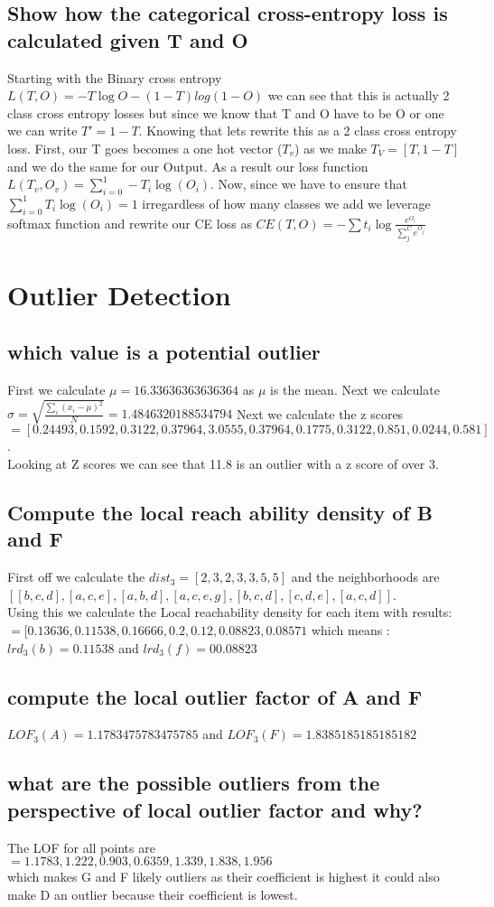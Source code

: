 \documentclass[11pt]{article}
\begin{document}
\subsection{Show how the categorical cross-entropy loss is calculated given T and O}
Starting with the Binary cross entropy $L(T,O) = -T \log O - (1-T) log(1-O)$ we can see that this is actually 2 class cross entropy losses but since we know that T and O have to be O or one we can write $T'=1-T$. Knowing that lets rewrite this as a 2 class cross entropy loss. First, our T goes becomes a one hot vector ($T_v$) as we make $T_V = [T, 1-T]$ and we do the same for our Output. As a result our loss function $L(T_v,O_v) = \sum_{i=0}^1 -T_i \log(O_i)$. Now, since we have to ensure that $\sum_{i=0}^1 T_i \log(O_i) = 1$ irregardless of how many classes we add we leverage softmax function and rewrite our CE loss as $CE(T,O) = - \sum t_i \log \frac{e^{O_i}}{\sum_j^C e^{O_j}}$
\section{Outlier Detection}
\subsection{which value is a potential outlier}
First we calculate $\mu=16.33636363636364$ as $\mu$ is the mean. Next we calculate $\sigma= \sqrt{\frac{\sum_i (x_i-\mu)^2}{N}}= 1.4846320188534794$
Next we calculate the z scores \\$=[ 0.24493,0.1592,0.3122,0.37964,3.0555,0.37964,0.1775, 0.3122,0.851,0.0244,0.581]$. \\ 
Looking at Z scores we can see that 11.8 is an outlier with a z score of over 3.
\subsection{Compute the local reach ability density of B and F}
First off we calculate the $dist_3 = [2,3,2,3,3,5,5]$ and the neighborhoods are \\
$[[b,c,d],[a,c,e],[a,b,d],[a,c,e,g],[b,c,d],[c,d,e],[a,c,d]]$.\\
Using this we calculate the Local reachability density for each item with results:\\
$= [0.13636,0.11538, 0.16666, 0.2, 0.12, 0.08823, 0.08571$ which means : \\
$lrd_3(b)=0.11538$ and  $lrd_3(f)=00.08823$
\subsection{compute the local outlier factor of A and F}
$LOF_3(A) = 1.1783475783475785$ and $LOF_3(F)= 1.8385185185185182$
\subsection{what are the possible outliers from the perspective of local outlier factor and why?}
The LOF for all points are \\$= 1.1783, 1.222, 0.903, 0.6359, 1.339, 1.838, 1.956$ \\ which makes G and F likely outliers as their coefficient is highest it could also make D an outlier because their coefficient is lowest.
\end{document}
